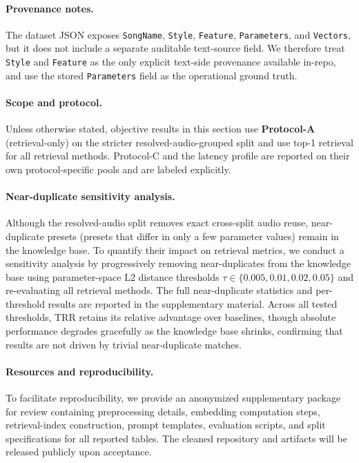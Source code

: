 \paragraph{Provenance notes.}
The dataset JSON exposes \texttt{SongName}, \texttt{Style}, \texttt{Feature}, \texttt{Parameters}, and \texttt{Vectors}, but it does not include a separate auditable text-source field. We therefore treat \texttt{Style} and \texttt{Feature} as the only explicit text-side provenance available in-repo, and use the stored \texttt{Parameters} field as the operational ground truth.

\paragraph{Scope and protocol.}
Unless otherwise stated, objective results in this section use \textbf{Protocol-A} (retrieval-only) on the stricter resolved-audio-grouped split and use top-1 retrieval for all retrieval methods. Protocol-C and the latency profile are reported on their own protocol-specific pools and are labeled explicitly.

\paragraph{Near-duplicate sensitivity analysis.}
Although the resolved-audio split removes exact cross-split audio reuse, near-duplicate presets (presets that differ in only a few parameter values) remain in the knowledge base. To quantify their impact on retrieval metrics, we conduct a sensitivity analysis by progressively removing near-duplicates from the knowledge base using parameter-space L2 distance thresholds $\tau \in \{0.005, 0.01, 0.02, 0.05\}$ and re-evaluating all retrieval methods. The full near-duplicate statistics and per-threshold results are reported in the supplementary material. Across all tested thresholds, TRR retains its relative advantage over baselines, though absolute performance degrades gracefully as the knowledge base shrinks, confirming that results are not driven by trivial near-duplicate matches.

\paragraph{Resources and reproducibility.}
\label{sec:repro}
To facilitate reproducibility, we provide an anonymized supplementary package for review containing preprocessing details, embedding computation steps, retrieval-index construction, prompt templates, evaluation scripts, and split specifications for all reported tables. The cleaned repository and artifacts will be released publicly upon acceptance.

